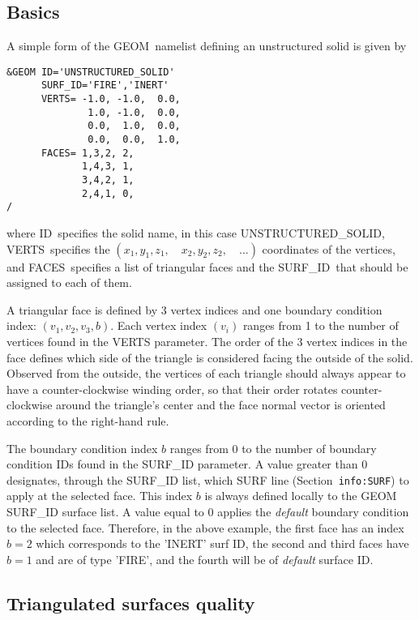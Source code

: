 \documentclass[12pt]{article}
\begin{document}
\subsection{Basics}
\label{info:GEOM_Basics}

A simple form of the {\ct GEOM}\ namelist defining an unstructured solid is given by

\begin{verbatim}
&GEOM ID='UNSTRUCTURED_SOLID'
      SURF_ID='FIRE','INERT'
      VERTS= -1.0, -1.0,  0.0,
              1.0, -1.0,  0.0,
              0.0,  1.0,  0.0,
              0.0,  0.0,  1.0,
      FACES= 1,3,2, 2,
             1,4,3, 1,
             3,4,2, 1,
             2,4,1, 0,
/
\end{verbatim}

\noindent where {\ct ID}\ specifies the solid name, in this case {\ct UNSTRUCTURED\_SOLID},
{\ct VERTS}\ specifies the $(x_1,y_1,z_1, \quad x_2,y_2,z_2, \quad ...)$ coordinates of the vertices,
and {\ct FACES}\ specifies a list of triangular faces and the {\ct SURF\_ID}\ that should be
assigned to each of them.

A triangular face is defined by 3 vertex indices and one boundary condition index: $(v_1,v_2,v_3,b)$.
Each vertex index $(v_i)$ ranges from 1 to the number of vertices found in the {\ct VERTS} parameter.
The order of the 3 vertex indices in the face defines which side of the triangle is considered facing
the outside of the solid. Observed from the outside, the vertices of each triangle should always appear
to have a counter-clockwise winding order, so that their order rotates counter-clockwise around the
triangle's center and the face normal vector is oriented according to the right-hand rule.

The boundary condition index $b$ ranges from 0 to the number of boundary condition {\ct IDs} found in
the {\ct SURF\_ID} parameter. A value greater than 0 designates, through the {\ct SURF\_ID} list, which
{\ct SURF} line (Section~\texttt{info:SURF}) to apply at the selected face. This index $b$ is always defined locally to the
{\ct GEOM SURF\_ID} surface list. A value equal to 0 applies the \textit{default} boundary condition to the selected face.
Therefore, in the above example, the first face has an index $b=2$ which corresponds to the {\ct 'INERT'} surf ID, the
second and third faces have $b=1$ and are of type {\ct 'FIRE'}, and the fourth will be of \textit{default} surface ID.

\subsection{Triangulated surfaces quality} \label{triangulated_surfaces_quality}
\end{document}
